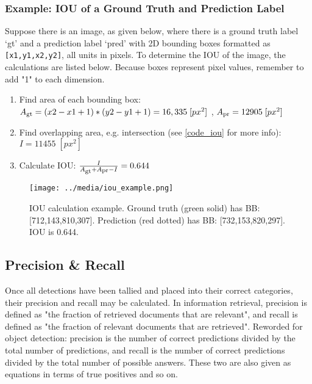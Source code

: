 \subsubsection{Example: IOU of a Ground Truth and Prediction Label}
Suppose there is an image, as given below, where there is a ground truth label `gt' and a prediction label `pred' with 2D bounding boxes formatted as \texttt{[x1,y1,x2,y2]}, all units in pixels. To determine the IOU of the image, the calculations are listed below. Because boxes represent pixel values, remember to add "1" to each dimension.



\def \pxpx {\; [px^2]}
\def \Asub #1{A\textsubscript{#1}}
\begin{enumerate}\itemsep=-0.5em

\item Find area of each bounding box: \\ $\Asub{gt} = (x2-x1+1)*(y2-y1+1) = 16,335 \pxpx $ , $ \Asub{pr} = 12905 \pxpx $

\item Find overlapping area, e.g. intersection (see \ref{code_iou} for more info): $I = 11455 \pxpx $

\item Calculate IOU: $\frac{I}{\Asub{gt} + \Asub{pr} - I} = 0.644 $
\end{enumerate}

\begin{figure}[h] %
    \centering
    \texttt{[image: ../media/iou\_example.png]}
    \caption{IOU calculation example. Ground truth (green solid) has BB: [712,143,810,307]. Prediction (red dotted) has BB: [732,153,820,297]. IOU is 0.644.}
    \label{iou_example} %
\end{figure}


\subsection{Precision \& Recall}
Once all detections have been tallied and placed into their correct categories, their precision and recall may be calculated. In information retrieval, precision is defined as "the fraction of retrieved documents that are relevant", and recall is defined as "the fraction of relevant documents that are retrieved". Reworded for object detection: precision is the number of correct predictions divided by the total number of predictions, and recall is the number of correct predictions divided by the total number of possible answers. These two are also given as equations in terms of true positives and so on. 

